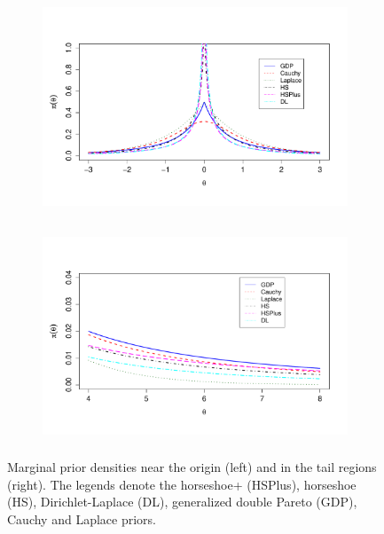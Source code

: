 \documentclass[11pt]{article}
\begin{document}
\begin{figure}[ht!]
  \begin{subfigure}{0.45\linewidth}
	\includegraphics[height=2.5in,width=\textwidth]{densities_zero_new}%
	\label{fig:zero}
	\end{subfigure}
	\hspace{0.1in}
  \begin{subfigure}{0.45\linewidth}
	\includegraphics[height=2.5in,width=\textwidth]{densities_tails_new}
  \label{fig:tails}
		\end{subfigure}
 \caption{Marginal prior densities near the origin (left) and in the tail regions (right). The legends denote the horseshoe+ (HSPlus), horseshoe (HS), Dirichlet-Laplace (DL), generalized double Pareto (GDP), Cauchy and Laplace priors.}
\end{figure}
\end{document}
